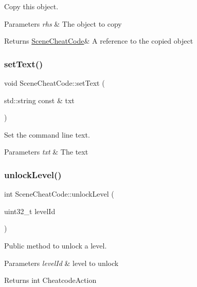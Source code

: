 Copy this object. 


\begin{DoxyParams}{Parameters}
{\em rhs} & The object to copy \\
\hline
\end{DoxyParams}
\begin{DoxyReturn}{Returns}
\hyperlink{class_scene_cheat_code}{Scene\+Cheat\+Code}\& A reference to the copied object 
\end{DoxyReturn}
\mbox{\label{class_scene_cheat_code_a1b35f3a6cce3767aa22a4694e3271532}} 
\subsubsection{\texorpdfstring{set\+Text()}{setText()}}
{\footnotesize\ttfamily void Scene\+Cheat\+Code\+::set\+Text (\begin{DoxyParamCaption}\item[{std\+::string const \&}]{txt }\end{DoxyParamCaption})}



Set the command line text. 


\begin{DoxyParams}{Parameters}
{\em txt} & The text \\
\hline
\end{DoxyParams}
\mbox{\label{class_scene_cheat_code_a98b29422b8c75d86ff960737ae05285b}} 
\subsubsection{\texorpdfstring{unlock\+Level()}{unlockLevel()}}
{\footnotesize\ttfamily int Scene\+Cheat\+Code\+::unlock\+Level (\begin{DoxyParamCaption}\item[{uint32\+\_\+t}]{level\+Id }\end{DoxyParamCaption})}



Public method to unlock a level. 


\begin{DoxyParams}{Parameters}
{\em level\+Id} & level to unlock \\
\hline
\end{DoxyParams}
\begin{DoxyReturn}{Returns}
int Cheatcode\+Action 
\end{DoxyReturn}
\mbox{\label{class_scene_cheat_code_ab6ae0c8b3adbce736429e61a27966e31}} 
